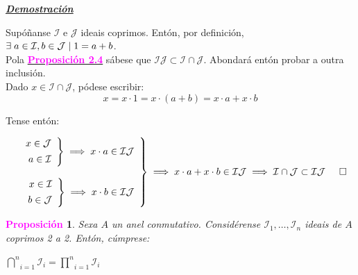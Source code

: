 \documentclass[twoside]{report}
\newcommand{\magbf}[1]{\textcolor{magenta}{\textbf{#1}}} %
\theoremstyle{mystyle}
\newtheorem{prop}{\magbf{Proposición}}[chapter]
\newenvironment{proposition}
{\begin{mdframed}[linecolor = magenta,backgroundcolor = classicrose, linewidth = 2mm]\begin{prop}}
{\end{prop}\end{mdframed}}
\begin{document}
\vspace{2mm}

\noindent \textbf{\textit{\underline{Demostración}}}

\vspace{2mm}

\noindent Supóñanse $\mathcal{I}$ e $\mathcal{J}$ ideais coprimos. Entón, por definición, $\exists \hspace{1mm} a \in \mathcal{I}, b \in \mathcal{J} \hspace{1mm} | \hspace{1mm} 1 = a + b$.\\

\noindent Pola \hyperref[prop2.4]{\magbf{Proposición 2.4}} sábese que $\mathcal{IJ} \subset \mathcal{I \cap J}$. Abondará entón probar a outra inclusión.\\

\noindent Dado $x \in \mathcal{I \cap J}$, pódese escribir:
$$x = x \cdot 1 = x \cdot (a + b) = x \cdot a + x \cdot b$$

\noindent Tense entón:

$$
\left. \begin{array}{r} 
\left. \begin{array}{r} 
x \in \mathcal{J}\\[1ex]
a \in \mathcal{I}
\end{array} \right\} 
\implies x \cdot a \in \mathcal{IJ} \\
\\
\left. \begin{array}{r}
x \in \mathcal{I}\\[1ex]
b \in \mathcal{J}
\end{array} \right\} 
\implies x \cdot b \in \mathcal{IJ}
\end{array} \right\} 
\implies x \cdot a + x \cdot b \in \mathcal{IJ} \implies \mathcal{I \cap J} \subset \mathcal{IJ} \hspace{5mm} \square
$$

\vspace{3mm}

\begin{proposition} \label{prop2.7}
Sexa $A$ un anel conmutativo. Considérense $\mathcal{I}_{1}, \dots, \mathcal{I}_{n}$ ideais de $A$ coprimos 2 a 2. Entón, cúmprese:
\begin{center}
    $\underset{i = 1}{\overset{n}{\bigcap}}\mathcal{I}_{i} = \underset{i = 1}{\overset{n}{\prod}}\mathcal{I}_{i}$  
\end{center}
\end{proposition}
\end{document}
